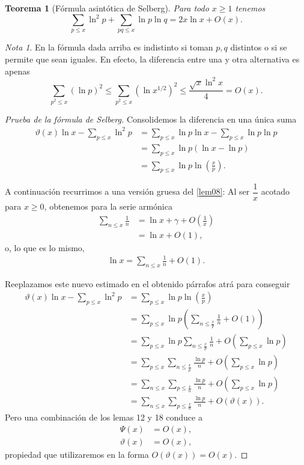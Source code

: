 \documentclass[10pt]{article}
\newtheorem{theorem}{Teorema}
\theoremstyle{definition}
\theoremstyle{remark}
\newtheorem*{note}{Nota}
\begin{document}
\begin{theorem}[F\'ormula asint\'otica de Selberg]
Para todo $x \geq 1$ tenemos
\[
\sum_{p \leq x} \ln^2 p + \sum_{pq \leq x} \ln p \ln q = 2x\ln x + O(x).
\]
\end{theorem}

\begin{note}
En la f\'ormula dada arriba es indistinto si toman $p,q$ distintos o si se permite que sean iguales. 
En efecto, la diferencia entre una y otra alternativa es apenas  
\[
\sum_{p^2 \le x} (\ln p)^2 \le \sum_{p^2 \le x} (\ln x^{1/2})^2 \le \frac{\sqrt{x} \ln^2 x}{4}= O(x).  
\]
\end{note}

\begin{proof}[Prueba de la f\'ormula de Selberg]
Consolidemos la diferencia en una \'unica suma 
\begin{align}
\vartheta(x)\ln x - \sum_{p \leq x} \ln^2 p &= \sum_{p \leq x} \ln p \ln x - \sum_{p \leq x} \ln p \ln p \\
&= \sum_{p \leq x} \ln p (\ln x - \ln p) \\
&= \sum_{p \leq x} \ln p \ln \left(\frac{x}{p}\right). 
\end{align}

A continuaci\'on recurrimos a una versi\'on gruesa del \cref{lem08}:
Al ser $\dfrac{1}{x}$ acotado para $x \ge 0$, obtenemos  para la serie arm\'onica 
\begin{align}
\sum_{n \leq x} \frac{1}{n} &= \ln x + \gamma + O\left(\frac{1}{x}\right) \\
&= \ln x + O(1),  
\end{align}
o, lo que es lo mismo, 
\begin{align}
\ln x = \sum_{n \leq x} \frac{1}{n} + O(1). 
\end{align}

Reeplazamos este nuevo estimado en el obtenido p\'arrafos atr\'a para conseguir 
\begin{align*}
\vartheta(x)\ln x - \sum_{p \leq x} \ln^2 p &= \sum_{p \leq x} \ln p \ln \left(\frac{x}{p}\right) \\
&= \sum_{p \leq x} \ln p \left(\sum_{n \leq \frac{x}{p}} \frac{1}{n} + O(1)\right) \\
&= \sum_{p \leq x} \ln p \sum_{n \leq \frac{x}{p}} \frac{1}{n} + O\left(\sum_{p \leq x} \ln p\right) \\
&= \sum_{p \leq x} \sum_{n \leq \frac{x}{p}} \frac{\ln p}{n} + O\left(\sum_{p \leq x} \ln p\right) \\
&= \sum_{n \leq x} \sum_{p \leq \frac{x}{n}} \frac{\ln p}{n} + O\left(\sum_{p \leq x} \ln p\right) \\
&= \sum_{n \leq x} \sum_{p \leq \frac{x}{n}} \frac{\ln p}{n} + O(\vartheta(x)).
\end{align*}
Pero una combinaci\'on de los lemas 12 y 18 conduce a 
\begin{align*}
\Psi(x) &= O(x),  \\
\vartheta(x) &= O(x),
\end{align*}
propiedad que utilizaremos en la forma $O(\vartheta(x))=O(x)$.


\end{proof}
\end{document}
